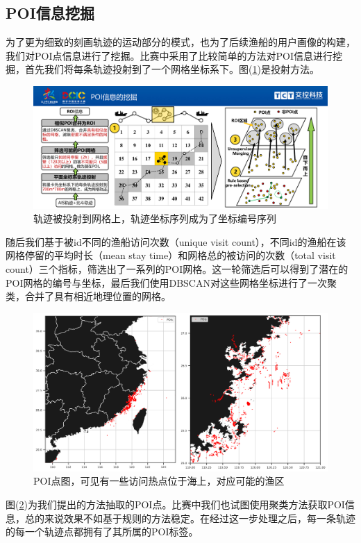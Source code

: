 \documentclass[UTF8, 12pt]{ctexart}
\begin{document}
		\subsection{POI信息挖掘}
		为了更为细致的刻画轨迹的运动部分的模式，也为了后续渔船的用户画像的构建，我们对POI点信息进行了挖掘。比赛中采用了比较简单的方法对POI信息进行挖掘，首先我们将每条轨迹投射到了一个网格坐标系下。图(\ref{sec_2_grid_compression})是投射方法。
		\begin{figure}[H]
			\centering
			\includegraphics[width=0.55\linewidth]{..//plots//poi_mining_method.pdf}
			\caption{轨迹被投射到网格上，轨迹坐标序列成为了坐标编号序列}
			\label{sec_2_grid_compression}
			\vspace{-0.2cm}
		\end{figure}
		随后我们基于被id不同的渔船访问次数（unique visit count），不同id的渔船在该网格停留的平均时长（mean stay time）和网格总的被访问的次数（total visit count）三个指标，筛选出了一系列的POI网格。这一轮筛选后可以得到了潜在的POI网格的编号与坐标，最后我们使用DBSCAN对这些网格坐标进行了一次聚类，合并了具有相近地理位置的网格。
		\begin{figure}[H]
			\centering
			\includegraphics[width=0.7\linewidth]{..//plots//feature_pois.png}
			\caption{POI点图，可见有一些访问热点位于海上，对应可能的渔区}
			\label{sec_2_fig_1}
			\vspace{-0.2cm}
		\end{figure}
		图(\ref{sec_2_fig_1})为我们提出的方法抽取的POI点。比赛中我们也试图使用聚类方法获取POI信息，总的来说效果不如基于规则的方法稳定。在经过这一步处理之后，每一条轨迹的每一个轨迹点都拥有了其所属的POI标签。

\end{document}
